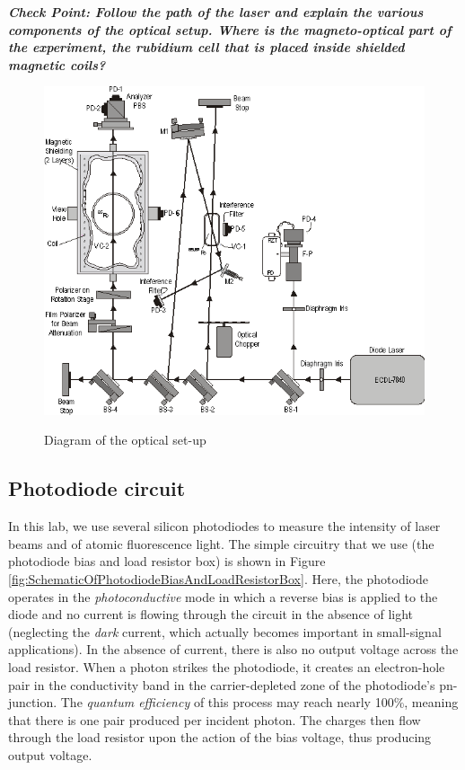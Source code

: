 \documentclass{../lab}
\begin{document}
\emph{\textbf{Check Point: Follow the path of the laser and explain the various components of the optical setup. Where is the magneto-optical part of the experiment, the rubidium cell that is placed inside shielded magnetic coils?}}

\begin{figure}[h]
    \centering
    \href{http://experimentationlab.berkeley.edu/sites/default/files/images/MNOimage003.gif}{\includegraphics[width=0.6\linewidth]{images/MNOimage003.png}}
    \caption{Diagram of the optical set-up}
    \label{fig:DiagramOfOpticalSetup}
\end{figure}

\newpage

\subsection{Photodiode circuit}

In this lab, we use several silicon photodiodes to measure the intensity of laser beams and of atomic fluorescence light. The simple circuitry that we use (the photodiode bias and load resistor box) is shown in Figure \ref{fig:SchematicOfPhotodiodeBiasAndLoadResistorBox}. Here, the photodiode operates in the \emph{photoconductive} mode in which a reverse bias is applied to the diode and no current is flowing through the circuit in the absence of light (neglecting the \emph{dark} current, which actually becomes important in small-signal applications). In the absence of current, there is also no output voltage across the load resistor. When a photon strikes the photodiode, it creates an electron-hole pair in the conductivity band in the carrier-depleted zone of the photodiode's pn-junction. The \emph{quantum efficiency} of this process may reach nearly 100\%, meaning that there is one pair produced per incident photon. The charges then flow through the load resistor upon the action of the bias voltage, thus producing output voltage.
\end{document}
